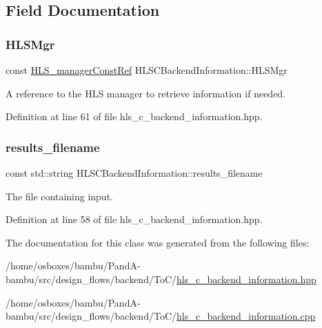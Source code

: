 \subsection{Field Documentation}
\mbox{\label{classHLSCBackendInformation_a840561eb78151f2a6c379d18521b38d1}} 
\subsubsection{\texorpdfstring{H\+L\+S\+Mgr}{HLSMgr}}
{\footnotesize\ttfamily const \hyperlink{hls__manager_8hpp_a1b481383e3beabc89bd7562ae672dd8c}{H\+L\+S\+\_\+manager\+Const\+Ref} H\+L\+S\+C\+Backend\+Information\+::\+H\+L\+S\+Mgr}



A reference to the H\+LS manager to retrieve information if needed. 



Definition at line 61 of file hls\+\_\+c\+\_\+backend\+\_\+information.\+hpp.

\mbox{\label{classHLSCBackendInformation_a2bbc68445d591f5e04c2a042e9833f5f}} 
\subsubsection{\texorpdfstring{results\+\_\+filename}{results\_filename}}
{\footnotesize\ttfamily const std\+::string H\+L\+S\+C\+Backend\+Information\+::results\+\_\+filename}



The file containing input. 



Definition at line 58 of file hls\+\_\+c\+\_\+backend\+\_\+information.\+hpp.



The documentation for this class was generated from the following files\+:\begin{DoxyCompactItemize}
\item 
/home/osboxes/bambu/\+Pand\+A-\/bambu/src/design\+\_\+flows/backend/\+To\+C/\hyperlink{hls__c__backend__information_8hpp}{hls\+\_\+c\+\_\+backend\+\_\+information.\+hpp}\item 
/home/osboxes/bambu/\+Pand\+A-\/bambu/src/design\+\_\+flows/backend/\+To\+C/\hyperlink{hls__c__backend__information_8cpp}{hls\+\_\+c\+\_\+backend\+\_\+information.\+cpp}\end{DoxyCompactItemize}
